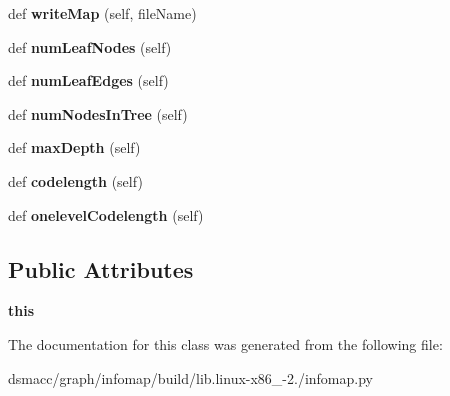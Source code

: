 \begin{DoxyCompactItemize}
def {\bfseries write\+Map} (self, file\+Name)
\item 
\mbox{\label{classinfomap_1_1HierarchicalNetwork_a490cb0c08760811f1383d769307d22d7}} 
def {\bfseries num\+Leaf\+Nodes} (self)
\item 
\mbox{\label{classinfomap_1_1HierarchicalNetwork_af09f5242f9066b9fd76a3b002703f6c0}} 
def {\bfseries num\+Leaf\+Edges} (self)
\item 
\mbox{\label{classinfomap_1_1HierarchicalNetwork_a7b1a87e15d0a18f5ab19d55e2c290aa6}} 
def {\bfseries num\+Nodes\+In\+Tree} (self)
\item 
\mbox{\label{classinfomap_1_1HierarchicalNetwork_a680f45dd82231d72c1098bb1d3ed0192}} 
def {\bfseries max\+Depth} (self)
\item 
\mbox{\label{classinfomap_1_1HierarchicalNetwork_a3e26779f81eedc3ec129f0d09e102f66}} 
def {\bfseries codelength} (self)
\item 
\mbox{\label{classinfomap_1_1HierarchicalNetwork_acde1588b4b0659adb228bddb100cee8f}} 
def {\bfseries onelevel\+Codelength} (self)
\end{DoxyCompactItemize}
\subsection*{Public Attributes}
\begin{DoxyCompactItemize}
\item 
\mbox{\label{classinfomap_1_1HierarchicalNetwork_abd7ed5a62598680ba64e3246b1d3c04c}} 
{\bfseries this}
\end{DoxyCompactItemize}


The documentation for this class was generated from the following file\+:\begin{DoxyCompactItemize}
\item 
dsmacc/graph/infomap/build/lib.\+linux-\/x86\+\_-\/2./infomap.\+py\end{DoxyCompactItemize}
